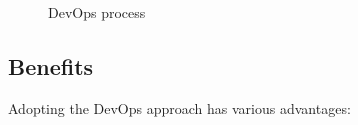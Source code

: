 \begin{figure}[!h]
    \centering
    \caption{DevOps process}
    \label{fig:devopscycle}
\end{figure}


\subsection{Benefits}
\qquad

Adopting the DevOps approach has various advantages:

